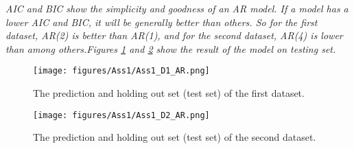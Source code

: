 \textit{\Gls{AIC} and \gls{BIC} show the simplicity and goodness of an \gls{AR} model. If a model has a lower \Gls{AIC} and \gls{BIC}, it will be generally better than others. So for the first dataset, \gls{AR}(2) is better than \gls{AR}(1), and for the second dataset, \gls{AR}(4) is lower than among others.Figures \ref{fig:Ass1_D1_AR} and \ref{fig:Ass1_D2_AR} show the result of the model on testing set.}




\begin{figure}[H]
    \centering
    \begin{minipage}[b]{1\textwidth}
        \texttt{[image: figures/Ass1/Ass1\_D1\_AR.png]}
    \end{minipage}
    \caption{The prediction and holding out set (test set) of the first dataset. }
    \label{fig:Ass1_D1_AR}
\end{figure}

\begin{figure}[H]
    \centering
    \begin{minipage}[b]{1\textwidth}
        \texttt{[image: figures/Ass1/Ass1\_D2\_AR.png]}
    \end{minipage}
    \caption{The prediction and holding out set (test set) of the second dataset. }
    \label{fig:Ass1_D2_AR}
\end{figure}